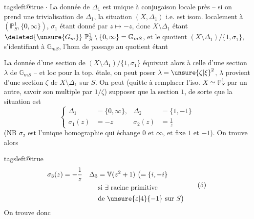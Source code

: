 \begingroup\csname tagsleft@true\endcsname
\(\cdot\) La donnée de \(\Delta_1\) est unique à conjugaison locale près -- si on prend une trivialisation de  \(\Delta_1\),  la situation \((X,\Delta_1)\) i.e.  est isom. localement à \((\mathbb P^1_S,\{0,\infty\})\), \(\sigma_1\) étant donné par \(z\mapsto-z\), donc \(X\setminus\Delta_1\) étant \(\deleted{\unsure{G_m}}\ \mathbb P^1_S\setminus\{0,\infty\}=\mathbb G_{mS}\), et le quotient \((X\setminus\Delta_1)/\{1,\sigma_1\}\), s'identifiant à \(\mathbb G_{mS}\), l'hom de passage au quotient étant

La donnée d'une section de \((X\setminus\Delta_1)/\{1,\sigma_1\}\) équivaut alors à celle d'une section \(\lambda\) de \(\mathbb G_{mS}\) -- et loc pour la top. étale, on peut poser \(\lambda=\unsure{\zeta|\xi}^2\),    \(\lambda\) provient d'une section \(\zeta\) de \(X\setminus\Delta_1\) sur \(S\). On peut (quitte à remplacer l'iso. \(X\simeq\mathbb P^1_S\) par un autre, savoir son multiple par \(1/\zeta\)) supposer que  la section \(1\), de sorte que la situation  est
\[
\left\{\begin{aligned}
\Delta_1&=\{0,\infty\},&\Delta_2&=\{1,-1\}\\
\sigma_1(z)&=-z&\sigma_2(z)&=\frac1z
\end{aligned}\right. \tag*{(4)}
\]
(NB \(\sigma_2\) est l'unique homographie qui échange \(0\) et \(\infty\), et fixe \(1\) et \(-1\)). On trouve alors
\endgroup

\begingroup\csname tagsleft@true\endcsname
\[
\begin{aligned}
\sigma_3(z)&=-\frac1z & \Delta_3&=\mathbb V(z^2+1)\ \bigl(=\{i,-i\}\\
&&&\text{si }\exists\ \text{racine primitive}\\
&&&\text{de }\unsure{\varepsilon|4}{-1}\ \text{sur }S\bigr)
\end{aligned} \tag*{(5)}
\]
On trouve donc

